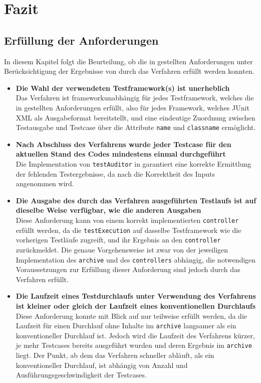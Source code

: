 \chapter{Fazit}\label{Fazit}
\section{Erfüllung der Anforderungen}
In diesem Kapitel folgt die Beurteilung, ob die in  gestellten Anforderungen unter Berücksichtigung der Ergebnisse von  durch das Verfahren erfüllt werden konnten. 

\begin{itemize}
    \item \textbf{Die Wahl der verwendeten Testframework(s) ist unerheblich}\\
    Das Verfahren ist frameworkunabhängig für jedes Testframework, welches die in  gestellten Anforderungen erfüllt, also für jedes Framework, welches JUnit XML als Ausgabeformat bereitstellt, und eine eindeutige Zuordnung zwischen Testausgabe und Testcase über die Attribute \texttt{name} und \texttt{classname} ermöglicht.
    \item \textbf{Nach Abschluss des Verfahrens wurde jeder Testcase für den aktuellen Stand des Codes mindestens einmal durchgeführt}\\
    Die Implementation von \texttt{testAuditor} in  garantiert eine korrekte Ermittlung der fehlenden Testergebnisse, da nach  die Korrektheit des Inputs angenommen wird. 
    \item \textbf{Die Ausgabe des durch das Verfahren ausgeführten Testlaufs ist auf dieselbe Weise verfügbar, wie die anderen Ausgaben}\\
    Diese Anforderung kann von einem korrekt implementierten \texttt{controller} erfüllt werden, da die \texttt{testExecution} auf dasselbe Testframework wie die vorherigen Testläufe zugreift, und ihr Ergebnis an den \texttt{controller} zurückmeldet. Die genaue Vorgehensweise ist zwar von der jeweiligen Implementation des \texttt{archive} und des \texttt{controllers} abhängig, die notwendigen Voraussetzungen zur Erfüllung dieser Anforderung sind jedoch durch das Verfahren erfüllt.
    \newpage
    \item \textbf{Die Laufzeit eines Testdurchlaufs unter Verwendung des Verfahrens ist kleiner oder gleich der Laufzeit eines konventionellen Durchlaufs}\\
    Diese Anforderung konnte mit Blick auf  nur teilweise erfüllt werden, da die Laufzeit für einen Durchlauf ohne Inhalte im \texttt{archive} langsamer als ein konventioneller Durchlauf ist. Jedoch wird die Laufzeit des Verfahrens kürzer, je mehr Testcases bereits ausgeführt wurden und deren Ergebnis im \texttt{archive} liegt. Der Punkt, ab dem das Verfahren schneller abläuft, als ein konventioneller Durchlauf, ist abhängig von Anzahl und Ausführungsgeschwindigkeit der Testcases.
\end{itemize}

